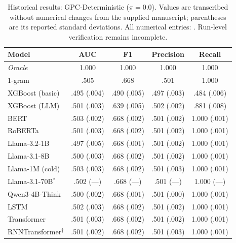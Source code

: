 \begin{table}[H]
\centering\small
\caption{Historical results: GPC-Deterministic ($\pi=0.0$). Values are transcribed without numerical changes from the supplied manuscript; parentheses are its reported standard deviations. All numerical entries: \ou. Run-level verification remains incomplete.}
\begin{tabular}{@{}lcccc@{}}\toprule
Model & AUC & F1 & Precision & Recall \\\midrule
\textit{Oracle} & 1.000 & 1.000 & 1.000 & 1.000 \\
1-gram & .505 & .668 & .501 & 1.000 \\
XGBoost (basic) & .495 (.004) & .490 (.005) & .497 (.003) & .484 (.006) \\
XGBoost (LLM) & .501 (.003) & .639 (.005) & .502 (.002) & .881 (.008) \\
BERT & .503 (.002) & .668 (.002) & .501 (.002) & 1.000 (.001) \\
RoBERTa & .501 (.003) & .668 (.002) & .501 (.002) & 1.000 (.001) \\
Llama-3.2-1B & .497 (.005) & .668 (.001) & .501 (.002) & 1.000 (.001) \\
Llama-3.1-8B & .500 (.003) & .668 (.002) & .501 (.002) & 1.000 (.001) \\
Llama-1M (cold) & .503 (.003) & .668 (.002) & .501 (.003) & 1.000 (.001) \\
Llama-3.1-70B$^{*}$ & .502 (---) & .668 (---) & .501 (---) & 1.000 (---) \\
Qwen3-4B-Think & .500 (.002) & .668 (.001) & .501 (.000) & 1.000 (.001) \\
LSTM & .502 (.003) & .668 (.002) & .501 (.002) & 1.000 (.001) \\
Transformer & .501 (.003) & .668 (.002) & .501 (.002) & 1.000 (.001) \\
RNNTransformer$^{\dagger}$ & .501 (.002) & .668 (.002) & .501 (.003) & 1.000 (.001) \\
\bottomrule\end{tabular}
\end{table}
